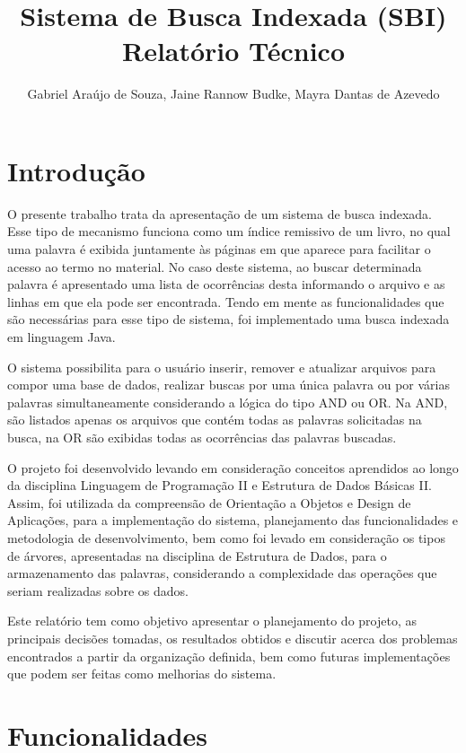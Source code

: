 \documentclass[12pt]{article}
\title{Sistema de Busca Indexada (SBI)\\ Relatório Técnico}
\author{Gabriel Araújo de Souza\inst{1}, Jaine Rannow Budke\inst{2}, Mayra Dantas de Azevedo\inst{3} }
\begin{document}
 

\maketitle

\section{Introdução}

O presente trabalho trata da apresentação de um sistema de busca indexada. Esse tipo de mecanismo funciona como um índice remissivo de um livro, no qual uma palavra é exibida juntamente às páginas em que aparece para facilitar o acesso ao termo no material. No caso deste sistema, ao buscar determinada palavra é apresentado uma lista de ocorrências desta informando o arquivo e as linhas em que ela pode ser encontrada. Tendo em mente as funcionalidades que são necessárias para esse tipo de sistema, foi implementado uma busca indexada em linguagem Java.

O sistema possibilita para o usuário inserir, remover e atualizar arquivos para compor uma base de dados, realizar buscas por uma única palavra ou por várias palavras simultaneamente considerando a lógica do tipo AND ou OR. Na AND, são listados apenas os arquivos que contém todas as palavras solicitadas na busca, na OR são exibidas todas as ocorrências das palavras buscadas.

O projeto foi desenvolvido levando em consideração conceitos aprendidos ao longo da disciplina Linguagem de Programação II e Estrutura de Dados Básicas II. Assim, foi utilizada da compreensão de Orientação a Objetos e Design de Aplicações, para a implementação do sistema, planejamento das funcionalidades e metodologia de desenvolvimento, bem como foi levado em consideração os tipos de árvores, apresentadas na disciplina de Estrutura de Dados, para o armazenamento das palavras, considerando a complexidade das operações que seriam realizadas sobre os dados.

Este relatório tem como objetivo apresentar o planejamento do projeto, as principais decisões tomadas, os resultados obtidos e discutir acerca dos problemas encontrados a partir da organização definida, bem como futuras implementações que podem ser feitas como melhorias do sistema.

\section{Funcionalidades}
\end{document}
